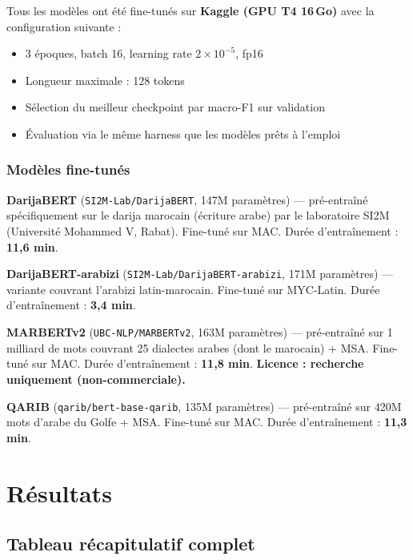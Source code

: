 \documentclass[12pt, a4paper]{article}
\begin{document}
Tous les modèles ont été fine-tunés sur \textbf{Kaggle (GPU T4 16\,Go)}
avec la configuration suivante :

\begin{itemize}
  \item 3 époques, batch 16, learning rate $2 \times 10^{-5}$, fp16
  \item Longueur maximale : 128 tokens
  \item Sélection du meilleur checkpoint par macro-F1 sur validation
  \item Évaluation via le même harness que les modèles prêts à l'emploi
\end{itemize}

\subsubsection{Modèles fine-tunés}

\textbf{DarijaBERT} (\texttt{SI2M-Lab/DarijaBERT}, 147M paramètres) —
pré-entraîné spécifiquement sur le darija marocain (écriture arabe) par le
laboratoire SI2M (Université Mohammed V, Rabat). Fine-tuné sur MAC.
Durée d'entraînement : \textbf{11,6 min}.

\textbf{DarijaBERT-arabizi} (\texttt{SI2M-Lab/DarijaBERT-arabizi}, 171M paramètres) —
variante couvrant l'arabizi latin-marocain. Fine-tuné sur MYC-Latin.
Durée d'entraînement : \textbf{3,4 min}.

\textbf{MARBERTv2} (\texttt{UBC-NLP/MARBERTv2}, 163M paramètres) —
pré-entraîné sur 1 milliard de mots couvrant 25 dialectes arabes (dont le
marocain) + MSA. Fine-tuné sur MAC.
Durée d'entraînement : \textbf{11,8 min}.
\textcolor{warnorange}{\textbf{Licence : recherche uniquement (non-commerciale).}}

\textbf{QARIB} (\texttt{qarib/bert-base-qarib}, 135M paramètres) —
pré-entraîné sur 420M mots d'arabe du Golfe + MSA. Fine-tuné sur MAC.
Durée d'entraînement : \textbf{11,3 min}.

\section{Résultats}

\subsection{Tableau récapitulatif complet}
\end{document}
